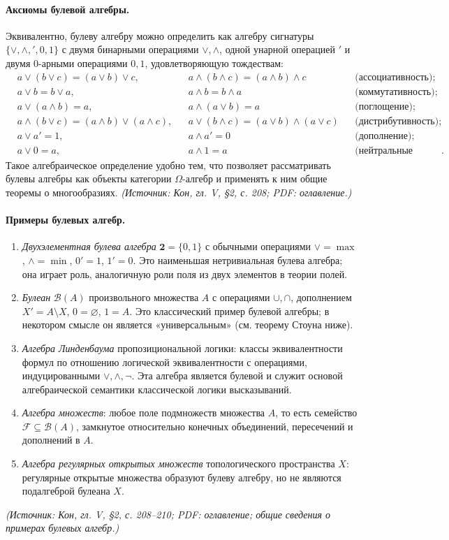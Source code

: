 \documentclass[a4paper,12pt]{article}
\begin{document}
\paragraph{Аксиомы булевой алгебры.}
Эквивалентно, булеву алгебру можно определить как алгебру сигнатуры \(\{\vee,\wedge,{}',0,1\}\) с двумя бинарными операциями \(\vee,\wedge\), одной унарной операцией \('\) и двумя 0-арными операциями \(0,1\), удовлетворяющую тождествам:
\[
\begin{aligned}
&a\vee(b\vee c)=(a\vee b)\vee c, &
&a\wedge(b\wedge c)=(a\wedge b)\wedge c &&\text{(ассоциативность)};\\
&a\vee b=b\vee a, &
&a\wedge b=b\wedge a &&\text{(коммутативность)};\\
&a\vee(a\wedge b)=a, &
&a\wedge(a\vee b)=a &&\text{(поглощение)};\\
&a\wedge(b\vee c)=(a\wedge b)\vee(a\wedge c), &
&a\vee(b\wedge c)=(a\vee b)\wedge(a\vee c) &&\text{(дистрибутивность)};\\
&a\vee a'=1, &
&a\wedge a'=0 &&\text{(дополнение)};\\
&a\vee0=a, &
&a\wedge1=a &&\text{(нейтральные элементы)}.
\end{aligned}
\]
Такое алгебраическое определение удобно тем, что позволяет рассматривать булевы алгебры как объекты категории \(\Omega\)-алгебр и применять к ним общие теоремы о многообразиях.
\textit{(Источник: Кон, гл. V, §2, с. 208; PDF: оглавление.)}

\paragraph{Примеры булевых алгебр.}
\begin{enumerate}[label=(\arabic*)]
\item \emph{Двухэлементная булева алгебра} \(\mathbf{2}=\{0,1\}\) с обычными операциями \(\vee=\max\), \(\wedge=\min\), \(0'=1\), \(1'=0\). Это наименьшая нетривиальная булева алгебра; она играет роль, аналогичную роли поля из двух элементов в теории полей.
\item \emph{Булеан} \(\mathcal{B}(A)\) произвольного множества \(A\) с операциями \(\cup,\cap\), дополнением \(X'=A\setminus X\), \(0=\varnothing\), \(1=A\). Это классический пример булевой алгебры; в некотором смысле он является «универсальным» (см. теорему Стоуна ниже).
\item \emph{Алгебра Линденбаума} пропозициональной логики: классы эквивалентности формул по отношению логической эквивалентности с операциями, индуцированными \(\vee,\wedge,\neg\). Эта алгебра является булевой и служит основой алгебраической семантики классической логики высказываний.
\item \emph{Алгебра множеств}: любое поле подмножеств множества \(A\), то есть семейство \(\mathcal{F}\subseteq\mathcal{B}(A)\), замкнутое относительно конечных объединений, пересечений и дополнений в \(A\).
\item \emph{Алгебра регулярных открытых множеств} топологического пространства \(X\): регулярные открытые множества образуют булеву алгебру, но не являются подалгеброй булеана \(X\).
\end{enumerate}
\textit{(Источник: Кон, гл. V, §2, с. 208--210; PDF: оглавление; общие сведения о примерах булевых алгебр.)}
\end{document}
